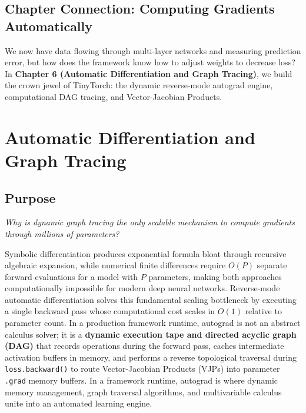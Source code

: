 \documentclass[
  letterpaper,
]{scrbook}
\begin{document}
\section{Chapter Connection: Computing Gradients
Automatically}\label{chapter-connection-computing-gradients-automatically}

We now have data flowing through multi-layer networks and measuring
prediction error, but how does the framework know how to adjust weights
to decrease loss? In \textbf{Chapter 6 (Automatic Differentiation and
Graph Tracing)}, we build the crown jewel of TinyTorch: the dynamic
reverse-mode autograd engine, computational DAG tracing, and
Vector-Jacobian Products.

\chapter{Automatic Differentiation and Graph
Tracing}\label{automatic-differentiation-and-graph-tracing}

\section*{Purpose}\label{purpose-6}


\emph{Why is dynamic graph tracing the only scalable mechanism to
compute gradients through millions of parameters?}

Symbolic differentiation produces exponential formula bloat through
recursive algebraic expansion, while numerical finite differences
require \(O(P)\) separate forward evaluations for a model with \(P\)
parameters, making both approaches computationally impossible for modern
deep neural networks. Reverse-mode automatic differentiation solves this
fundamental scaling bottleneck by executing a single backward pass whose
computational cost scales in \(O(1)\) relative to parameter count. In a
production framework runtime, autograd is not an abstract calculus
solver; it is a \textbf{dynamic execution tape and directed acyclic
graph (DAG)} that records operations during the forward pass, caches
intermediate activation buffers in memory, and performs a reverse
topological traversal during \texttt{loss.backward()} to route
Vector-Jacobian Products (VJPs) into parameter \texttt{.grad} memory
buffers. In a framework runtime, autograd is where dynamic memory
management, graph traversal algorithms, and multivariable calculus unite
into an automated learning engine.
\end{document}
